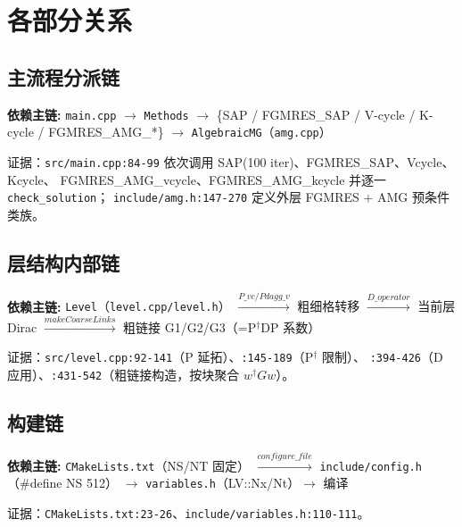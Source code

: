 \documentclass[UTF8]{ctexart}
\begin{document}
\section{各部分关系}

\subsection{主流程分派链}
\begin{keybox}
\textbf{依赖主链:} \textcolor{relation}{\texttt{main.cpp} $\rightarrow$ \texttt{Methods}
$\rightarrow$ \{SAP / FGMRES\_SAP / V-cycle / K-cycle / FGMRES\_AMG\_*\} $\rightarrow$
\texttt{AlgebraicMG}（\texttt{amg.cpp}）}
\end{keybox}
证据：\texttt{src/main.cpp:84-99} 依次调用 SAP(100 iter)、FGMRES\_SAP、Vcycle、Kcycle、
FGMRES\_AMG\_vcycle、FGMRES\_AMG\_kcycle 并逐一 \texttt{check\_solution}；
\texttt{include/amg.h:147-270} 定义外层 FGMRES + AMG 预条件类族。

\subsection{层结构内部链}
\begin{keybox}
\textbf{依赖主链:} \textcolor{relation}{\texttt{Level}（\texttt{level.cpp/level.h}）
$\xrightarrow{P\_vc/Pdagg\_v}$ 粗细格转移 $\xrightarrow{D\_operator}$ 当前层 Dirac
$\xrightarrow{makeCoarseLinks}$ 粗链接 G1/G2/G3（=P$^\dagger$DP 系数）}
\end{keybox}
证据：\texttt{src/level.cpp:92-141}（P 延拓）、\texttt{:145-189}（P$^\dagger$ 限制）、
\texttt{:394-426}（D 应用）、\texttt{:431-542}（粗链接构造，按块聚合 $w^\dagger G w$）。

\subsection{构建链}
\begin{keybox}
\textbf{依赖主链:} \textcolor{relation}{\texttt{CMakeLists.txt}（NS/NT 固定）
$\xrightarrow{configure\_file}$ \texttt{include/config.h}（\#define NS 512）
$\rightarrow$ \texttt{variables.h}（LV::Nx/Nt）$\rightarrow$ 编译}
\end{keybox}
证据：\texttt{CMakeLists.txt:23-26}、\texttt{include/variables.h:110-111}。
\end{document}
